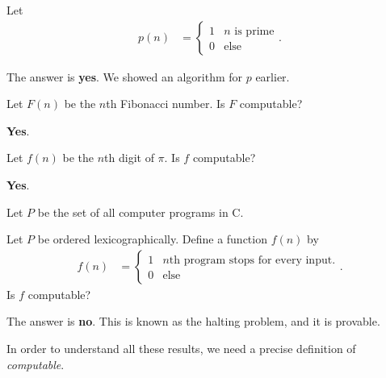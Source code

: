 \documentclass[10pt]{mypackage}
\begin{document}
\begin{question}
  Let
  \begin{align*}
    p(n) &= \begin{cases}
      1 & \text{$n$ is prime}\\
      0 & \text{else}
    \end{cases}.
  \end{align*}
\end{question}
\begin{answer}
  The answer is \textbf{yes}. We showed an algorithm for $p$ earlier.
\end{answer}
\begin{question}
  Let $F(n)$ be the $n$th Fibonacci number. Is $F$ computable?
\end{question}
\begin{answer}
  \textbf{Yes}.
\end{answer}
\begin{question}
  Let $f(n)$ be the $n$th digit of $\pi$. Is $f$ computable?
\end{question}
\begin{answer}
  \textbf{Yes}.
\end{answer}
\begin{question}
  Let $P$ be the set of all computer programs in C.\newline

  Let $P$ be ordered lexicographically. Define a function $f(n)$ by
  \begin{align*}
    f(n) &= \begin{cases}
      1 & \text{$n$th program stops for every input.}\\
      0 & \text{else}
    \end{cases}.
  \end{align*}
  Is $f$ computable?
\end{question}
\begin{answer}
  The answer is \textbf{no}. This is known as the halting problem, and it is provable.
\end{answer}
In order to understand all these results, we need a precise definition of \textit{computable}.\newline
\end{document}
